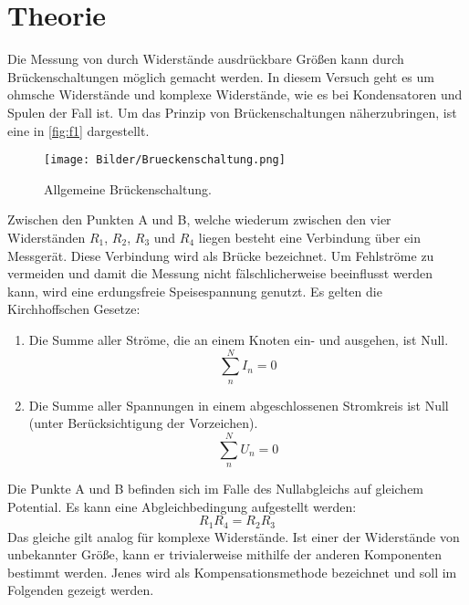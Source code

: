 \section{Theorie}
\label{sec:Theorie}

Die Messung von durch Widerstände ausdrückbare Größen kann durch Brückenschaltungen 
möglich gemacht werden. In diesem Versuch geht es um ohmsche Widerstände
und komplexe Widerstände, wie es bei Kondensatoren und Spulen der Fall ist.
Um das Prinzip von Brückenschaltungen näherzubringen, ist eine in \autoref{fig:f1}
dargestellt.
\begin{figure}[H]
    \centering
        \centering
        \texttt{[image: Bilder/Brueckenschaltung.png]}
        \caption{Allgemeine Brückenschaltung. \cite{anleitung}}
    \hfill
    \label{fig:f1}
\end{figure}
\noindent Zwischen den Punkten A und B, welche wiederum zwischen den vier Widerständen 
$R_1$, $R_2$, $R_3$ und $R_4$ liegen besteht eine Verbindung über ein Messgerät. 
Diese Verbindung wird als Brücke bezeichnet. Um Fehlströme zu vermeiden und damit 
die Messung nicht fälschlicherweise beeinflusst werden kann, wird eine erdungsfreie 
Speisespannung genutzt. Es gelten die Kirchhoffschen Gesetze:
\begin{enumerate}
    \item Die Summe aller Ströme, die an einem Knoten ein- und ausgehen, ist Null.
    \begin{equation}
        \sum\limits_{n}^N I_n = 0
    \end{equation}
    \item Die Summe aller Spannungen in einem abgeschlossenen Stromkreis ist Null 
    (unter Berücksichtigung der Vorzeichen).
    \begin{equation}
        \sum\limits_{n}^N U_n = 0
    \end{equation}
\end{enumerate}
\par\vspace{0.5em}
\noindent Die Punkte A und B befinden sich im Falle des Nullabgleichs auf
gleichem Potential. Es kann eine Abgleichbedingung aufgestellt werden:
\begin{equation}
    R_1 R_4 = R_2 R_3
\end{equation}
Das gleiche gilt analog für komplexe Widerstände. Ist einer der Widerstände 
von unbekannter Größe, kann er trivialerweise mithilfe der anderen Komponenten 
bestimmt werden. Jenes wird als Kompensationsmethode bezeichnet und soll im 
Folgenden gezeigt werden.

